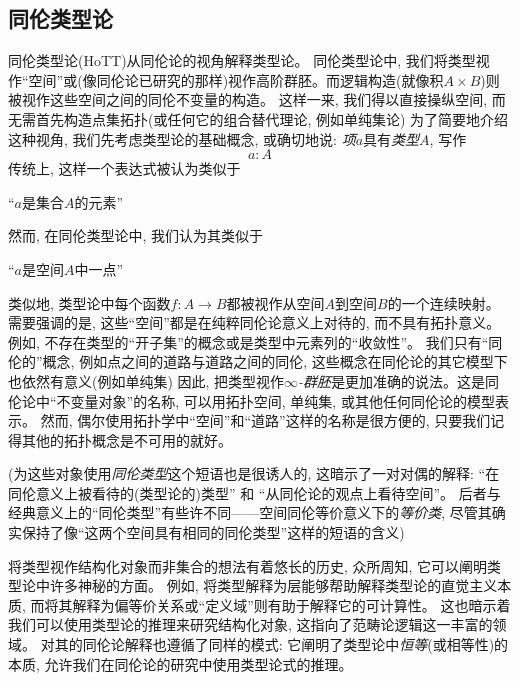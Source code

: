 \subsection*{同伦类型论}

同伦类型论(HoTT)从同伦论的视角解释类型论。
同伦类型论中, 我们将类型视作``空间''或(像同伦论已研究的那样)视作高阶群胚。而逻辑构造(就像积$A \times B$)则被视作这些空间之间的同伦不变量的构造。
这样一来, 我们得以直接操纵空间, 而无需首先构造点集拓扑(或任何它的组合替代理论, 例如单纯集论)
为了简要地介绍这种视角, 我们先考虑类型论的基础概念, 或确切地说:
\emph{项}$a$具有\emph{类型}$A$, 写作
\[
a : A
\]
传统上, 这样一个表达式被认为类似于
\begin{center}
``$a$是集合$A$的元素''
\end{center}
然而, 在同伦类型论中, 我们认为其类似于
\begin{center}
``$a$是空间$A$中一点''
\end{center}

%

类似地, 类型论中每个函数$f: A\to B$都被视作从空间$A$到空间$B$的一个连续映射。
需要强调的是, 这些``空间''都是在纯粹同伦论意义上对待的, 而不具有拓扑意义。
例如, 不存在类型的``开子集''的概念或是类型中元素列的``收敛性''。
我们只有``同伦的''概念, 例如点之间的道路与道路之间的同伦, 这些概念在同伦论的其它模型下也依然有意义(例如单纯集)
因此, 把类型视作\emph{$\infty$-群胚}是更加准确的说法。这是同伦论中``不变量对象''的名称, 可以用拓扑空间, 
%
单纯集, 或其他任何同伦论的模型表示。
然而, 偶尔使用拓扑学中``空间''和``道路''这样的名称是很方便的, 只要我们记得其他的拓扑概念是不可用的就好。

(为这些对象使用\emph{同伦类型}这个短语也是很诱人的, 
%
这暗示了一对对偶的解释: ``在同伦意义上被看待的(类型论的)类型'' 和 ``从同伦论的观点上看待空间''。
后者与经典意义上的``同伦类型''有些许不同——空间同伦等价意义下的\emph{等价类}, 尽管其确实保持了像``这两个空间具有相同的同伦类型''这样的短语的含义)

将类型视作结构化对象而非集合的想法有着悠长的历史, 众所周知, 它可以阐明类型论中许多神秘的方面。
例如, 将类型解释为层能够帮助解释类型论的直觉主义本质, 而将其解释为偏等价关系或``定义域''则有助于解释它的可计算性。
这也暗示着我们可以使用类型论的推理来研究结构化对象, 这指向了范畴论逻辑这一丰富的领域。
对其的同伦论解释也遵循了同样的模式: 它阐明了类型论中\emph{恒等}(或相等性)的本质, 允许我们在同伦论的研究中使用类型论式的推理。

